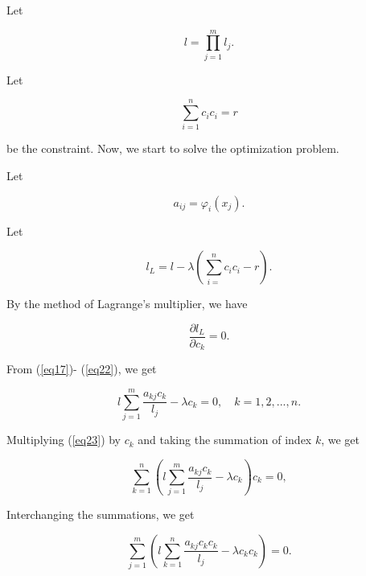 \documentclass [18pt]{article}
\begin{document}
Let


\begin{equation}
\label{eq18}
l = \prod\limits_{j = 1}^m {l_j } .
\end{equation}



Let


\begin{equation}
\label{eq19}
\sum\limits_{i = 1}^n {c_i c_i } = r
\end{equation}



\noindent
be the constraint. Now, we start to solve the optimization problem.

Let


\begin{equation}
\label{eq20}
a_{ij} = \varphi _i (x_j ).
\end{equation}



Let


\begin{equation}
\label{eq21}
l_L = l - \lambda (\sum\limits_{i = }^n {c_i c_i } - r).
\end{equation}



By the method of Lagrange's multiplier, we have


\begin{equation}
\label{eq22}
\frac{\partial l_L }{\partial c_k } = 0.
\end{equation}



From (\ref{eq17})- (\ref{eq22}), we get


\begin{equation}
\label{eq23}
l\sum\limits_{j = 1}^m {\frac{a_{kj} c_k }{l_j }} - \lambda c_k = 0,
\quad
k = 1,2,...,n.
\end{equation}



Multiplying (\ref{eq23}) by $c_k $ and taking the summation of index $k$, we get


\begin{equation}
\label{eq24}
\sum\limits_{k = 1}^n {(l\sum\limits_{j = 1}^m {\frac{a_{kj} c_k }{l_j }} -
\lambda c_k )c_k } = 0,
\end{equation}



Interchanging the summations, we get


\begin{equation}
\label{eq25}
\sum\limits_{j = 1}^m {(l\sum\limits_{k = 1}^n {\frac{a_{kj} c_k c_k }{l_j
}} - \lambda c_k c_k )} = 0.
\end{equation}
\end{document}

